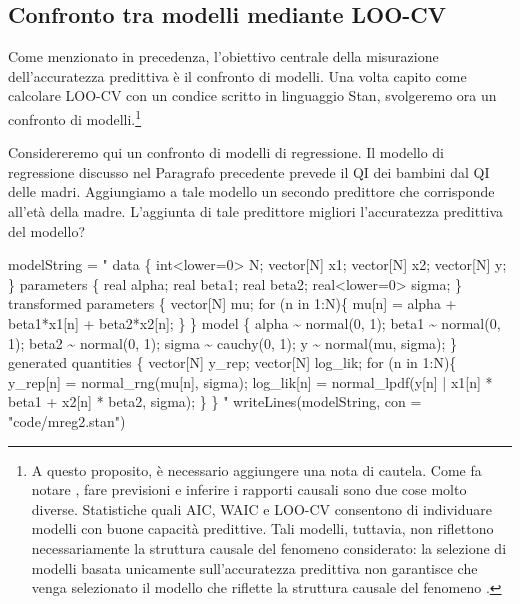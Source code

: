 \documentclass[
  10pt,
  italian,
  a4paper,
  extrafontsizes,onecolumn,openright
  ]{memoir}
\newenvironment{Shaded}{\begin{snugshade}}{\end{snugshade}}
\newcommand{\AttributeTok}[1]{\textcolor[rgb]{0.77,0.63,0.00}{#1}}
\newcommand{\FunctionTok}[1]{\textcolor[rgb]{0.00,0.00,0.00}{#1}}
\newcommand{\NormalTok}[1]{#1}
\newcommand{\OtherTok}[1]{\textcolor[rgb]{0.56,0.35,0.01}{#1}}
\newcommand{\StringTok}[1]{\textcolor[rgb]{0.31,0.60,0.02}{#1}}
\theoremstyle{definition}
\theoremstyle{definition}
\theoremstyle{definition}
\theoremstyle{definition}
\theoremstyle{remark}
\begin{document}
\hypertarget{confronto-tra-modelli-mediante-loo-cv}{%
\subsection{Confronto tra modelli mediante LOO-CV}\label{confronto-tra-modelli-mediante-loo-cv}}

Come menzionato in precedenza, l'obiettivo centrale della misurazione dell'accuratezza predittiva è il confronto di modelli. Una volta capito come calcolare LOO-CV con un condice scritto in linguaggio Stan, svolgeremo ora un confronto di modelli.\footnote{A questo proposito, è necessario aggiungere una nota di cautela. Come fa notare \textcite{McElreath_rethinking}, fare previsioni e inferire i rapporti causali sono due cose molto diverse. Statistiche quali AIC, WAIC e LOO-CV consentono di individuare modelli con buone capacità predittive. Tali modelli, tuttavia, non riflettono necessariamente la struttura causale del fenomeno considerato: la selezione di modelli basata unicamente sull'accuratezza predittiva non garantisce che venga selezionato il modello che riflette la struttura causale del fenomeno \autocite[si veda anche][]{navarro2019between}.}

Considereremo qui un confronto di modelli di regressione. Il modello di regressione discusso nel Paragrafo precedente prevede il QI dei bambini dal QI delle madri. Aggiungiamo a tale modello un secondo predittore che corrisponde all'età della madre. L'aggiunta di tale predittore migliori l'accuratezza predittiva del modello?

\begin{Shaded}
\begin{Highlighting}[]
\NormalTok{modelString }\OtherTok{=} \StringTok{"}
\StringTok{data \{}
\StringTok{  int\textless{}lower=0\textgreater{} N;}
\StringTok{  vector[N] x1;}
\StringTok{  vector[N] x2;}
\StringTok{  vector[N] y;}
\StringTok{\}}
\StringTok{parameters \{}
\StringTok{  real alpha;}
\StringTok{  real beta1;}
\StringTok{  real beta2;}
\StringTok{  real\textless{}lower=0\textgreater{} sigma;}
\StringTok{\}}
\StringTok{transformed parameters \{}
\StringTok{  vector[N] mu;}
\StringTok{  for (n in 1:N)\{}
\StringTok{    mu[n] = alpha + beta1*x1[n] + beta2*x2[n];}
\StringTok{  \}}
\StringTok{\}}
\StringTok{model \{}
\StringTok{  alpha \textasciitilde{} normal(0, 1);}
\StringTok{  beta1 \textasciitilde{} normal(0, 1);}
\StringTok{  beta2 \textasciitilde{} normal(0, 1);}
\StringTok{  sigma \textasciitilde{} cauchy(0, 1);}
\StringTok{  y \textasciitilde{} normal(mu, sigma);}
\StringTok{\}}
\StringTok{generated quantities \{}
\StringTok{  vector[N] y\_rep;}
\StringTok{  vector[N] log\_lik;}
\StringTok{  for (n in 1:N)\{}
\StringTok{    y\_rep[n] = normal\_rng(mu[n], sigma);}
\StringTok{    log\_lik[n] = normal\_lpdf(y[n] | x1[n] * beta1 + x2[n] * beta2, sigma);}
\StringTok{  \}}
\StringTok{\}}
\StringTok{"}
\FunctionTok{writeLines}\NormalTok{(modelString, }\AttributeTok{con =} \StringTok{"code/mreg2.stan"}\NormalTok{)}
\end{Highlighting}
\end{Shaded}
\end{document}
